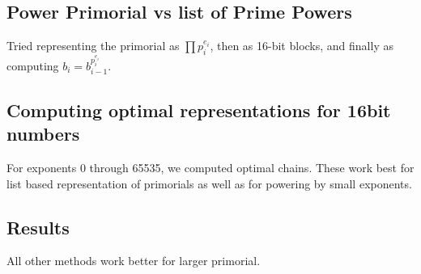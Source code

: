 \documentclass{ucalgthes1}
\theoremstyle{plain}
\theoremstyle{definition}
\begin{document}
\subsection{Power Primorial vs list of Prime Powers}
Tried representing the primorial as $\prod p_i^{e_i}$, then as 16-bit blocks, and finally as computing $b_i=b_{i-1}^{p_i^{e_i}}$.

\subsection{Computing optimal representations for 16bit numbers}
For exponents 0 through 65535, we computed optimal chains.  These work best for list based representation of primorials as well as for powering by small exponents.

\subsection{Results}
All other methods work better for larger primorial.
\end{document}
